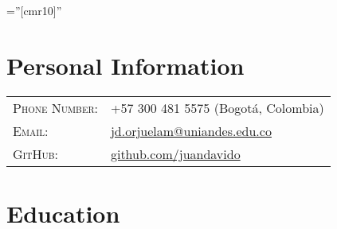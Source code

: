 \documentclass[a4paper,10pt]{article} %
\begin{document}
\pagestyle{empty} %

\font\fb=''[cmr10]'' %



\par{ \par\bigskip} %
\par{ \par\bigskip} %

\color{OrangeRed}
\section{Personal Information}
\color{black}

\begin{tabular}{ll}
\textsc{Phone Number:} & +57 300 481 5575 (Bogot\'a, Colombia)\\
\textsc{Email:} & \href{mailto:jd.orjuelam@uniandes.edu.co}{jd.orjuelam@uniandes.edu.co}\\
\textsc{GitHub:} & \url{github.com/juandavido}
\end{tabular}


\color{OrangeRed}
\section{Education}
\color{black}
\end{document}
